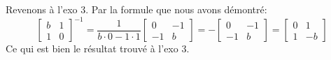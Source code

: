 \documentclass{article}
\begin{document}
\noindent Revenons à l'exo 3. Par la formule que nous avons démontré:
$$\begin{bmatrix} b & 1 \\ 1 &  0\end{bmatrix}^{-1} = \frac{1}{b\cdot 0 - 1\cdot 1} \begin{bmatrix} 0 & -1 \\ -1 &  b\end{bmatrix} = -\begin{bmatrix} 0 & -1 \\ -1 &  b\end{bmatrix} = \begin{bmatrix} 0 & 1 \\ 1 &  -b\end{bmatrix}$$
Ce qui est bien le résultat trouvé à l'exo 3.
\end{document}
